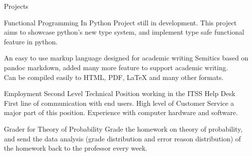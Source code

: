 \documentclass[]{resume-knyte}
\begin{document}
\newpage

\begin{topic}{Projects}


    {Functional Programming In Python}
    {Project still in development.
    This project aims to showcase python's new type system, and implement type safe functional feature in python.}

    {An easy to use markup language designed for academic writing}
    {Semitics based on pandoc markdown, added many more feature to support academic writing.\\
    Can be compiled easily to HTML, PDF, \LaTeX{} and many other formats.}
    \\

\end{topic}


\begin{topic}{Employment}
    {Second Level Technical Position working in the ITSS Help Desk}
    {First line of communication with end users. High level of Customer Service a major part of this position.
    Experience with computer hardware and software.}

    {Grader for Theory of Probability}
    {Grade the homework on theory of probability,
    and send the data analysis (grade distribution and error reason distribution)
    of the homework back to the professor every week.}
\end{topic}
\end{document}
